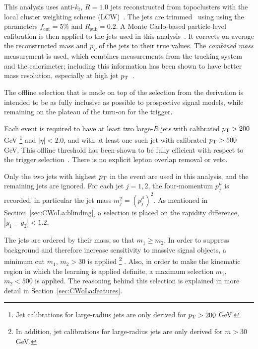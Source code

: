 This analysis uses anti-$k_t$, $R=1.0$ jets reconstructed from topoclusters with the local cluster weighting scheme (LCW)~\cite{Aad:2016upy}.
The jets are trimmed~\cite{Krohn:2009th} using using the parameters $f_\text{cut} = 5\%$ and $R_\text{sub} = 0.2$.
A Monte Carlo-based particle-level calibration is then applied to the jets used in this analysis~\cite{Aaboud:2018kfi}.
It corrects on average the reconstructed mass and $p_T$ of the jets to their true values.
The \textit{combined mass} measurement is used, which combines measurements from the tracking system and the calorimeter; including this information has been shown to have better mass resolution, especially at high jet $p_{\text{T}}$~\cite{ATLAS-CONF-2016-035}.

The offline selection that is made on top of the selection from the derivation is intended to be as fully inclusive as possible to prospective signal models, while remaining on the plateau of the turn-on for the trigger.

Each event is required to have at least two large-$R$ jets with calibrated $p_{\text{T}}>200$ GeV
\footnote{Jet calibrations for large-radius jets are only derived for $p_{\text{T}}>200$ GeV.
}
and $|\eta|<2.0$, and with at least one such jet with calibrated $p_{\text{T}}>500$ GeV.
This offline threshold has been shown to be fully efficient with respect to the trigger selection~\cite{Adorni:2647394}.
There is no explicit lepton overlap removal or veto.

Only the two jets with highest $p_{\text{T}}$ in the event are used in this analysis, and the remaining jets are ignored.
For each jet $j=1,2$, the four-momentum $p^\mu_j$ is recorded, in particular the jet mass $m_j^2 = (p^\mu_j)^2$.
As mentioned in Section~\ref{sec:CWoLa:blinding}, a selection is placed on the rapidity difference, $|y_1-y_2|<1.2$.

The jets are ordered by their mass, so that $m_1 \ge m_2$.
In order to suppress background and therefore increase sensitivity to massive signal objects, a minimum cut $m_1$, $m_2 > 30$ \GeV{} is applied
\footnote{In addition, jet calibrations for large-radius jets are only derived for $m>30$ GeV.}
.
Also, in order to make the kinematic region in which the learning is applied definite, a maximum selection $m_1$, $m_2 < 500$ \GeV{} is applied.
The reasoning behind this selection is explained in more detail in Section~\ref{sec:CWoLa:features}.

